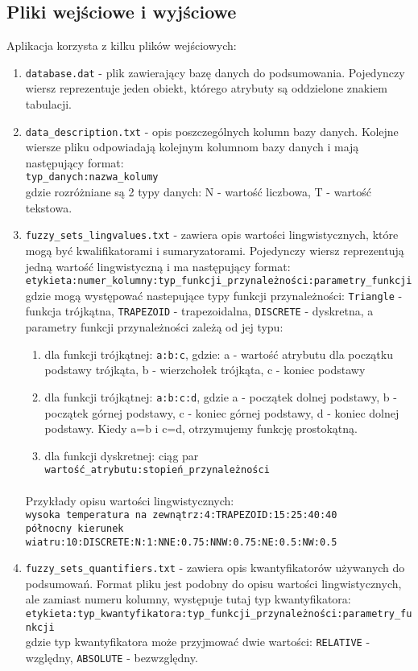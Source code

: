 \documentclass{classrep}
\begin{document}
\subsection{Pliki wejściowe i wyjściowe}
Aplikacja korzysta z kilku plików wejściowych:
\begin{enumerate}
\item \verb|database.dat| - plik zawierający bazę danych do podsumowania. Pojedynczy wiersz reprezentuje jeden obiekt, którego atrybuty są oddzielone znakiem tabulacji.
\item \verb|data_description.txt| - opis poszczególnych kolumn bazy danych. Kolejne wiersze pliku odpowiadają kolejnym kolumnom bazy danych i mają następujący format:\\
\verb|typ_danych:nazwa_kolumy|\\
gdzie rozróżniane są 2 typy danych: N - wartość liczbowa, T - wartość tekstowa.
\item \verb|fuzzy_sets_lingvalues.txt| - zawiera opis wartości lingwistycznych, które mogą być kwalifikatorami i sumaryzatorami. Pojedynczy wiersz reprezentują jedną wartość lingwistyczną i ma następujący format:\\
\verb|etykieta:numer_kolumny:typ_funkcji_przynależności:parametry_funkcji|
gdzie mogą występować nastepujące typy funkcji przynależności: \verb|Triangle| - funkcja trójkątna, \verb|TRAPEZOID| - trapezoidalna, \verb|DISCRETE| - dyskretna, 
a parametry funkcji przynależności zależą od jej typu:
\begin{enumerate}
\item dla funkcji trójkątnej: \verb|a:b:c|, gdzie: a - wartość atrybutu dla początku podstawy trójkąta, b - wierzchołek trójkąta, c - koniec podstawy
\item dla funkcji trójkątnej: \verb|a:b:c:d|, gdzie a - początek dolnej podstawy, b - początek górnej podstawy, c - koniec górnej podstawy, d - koniec dolnej podstawy. Kiedy a=b i c=d, otrzymujemy funkcję prostokątną.
\item dla funkcji dyskretnej: ciąg par \verb|wartość_atrybutu:stopień_przynależności|
\end{enumerate}

\paragraph{}
Przykłady opisu wartości lingwistycznych:\\
\verb|wysoka temperatura na zewnątrz:4:TRAPEZOID:15:25:40:40|\\
\verb|północny kierunek wiatru:10:DISCRETE:N:1:NNE:0.75:NNW:0.75:NE:0.5:NW:0.5|\\

\item \verb|fuzzy_sets_quantifiers.txt| - zawiera opis kwantyfikatorów używanych do podsumowań. Format pliku jest podobny do opisu wartości lingwistycznych, ale zamiast numeru kolumny, występuje tutaj typ kwantyfikatora:\\
\verb|etykieta:typ_kwantyfikatora:typ_funkcji_przynależności:parametry_funkcji|\\
gdzie typ kwantyfikatora może przyjmować dwie wartości: \verb|RELATIVE| - względny, \verb|ABSOLUTE| - bezwzględny. 
\end{enumerate}
\end{document}
